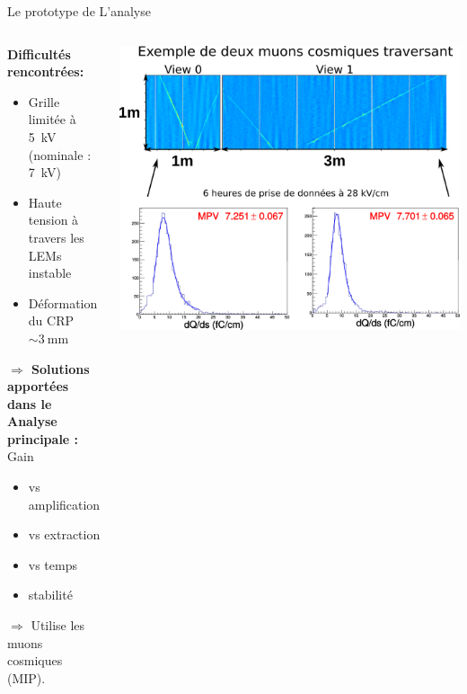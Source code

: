     \begin{frame}{Le prototype de \TOO{}}{L'analyse}
       	\begin{scriptsize}
       		\vfill
       		\begin{columns}
       			\begin{column}{0.32\textwidth}
       				\textbf{Difficultés rencontrées:} 
       				\begin{itemize}
       					\item Grille limitée à \SI{5}{\kilo\volt} (nominale : \SI{7}{\kilo\volt})
       					\item Haute tension à travers les LEMs instable
       					\item Déformation du CRP $\sim\SI{3}{\milli\meter}$
       				\end{itemize}
       				\textbf{$\Rightarrow$ Solutions apportées dans le \SSS{}} \\
       				\vspace{0.3cm}
       				\textbf{Analyse principale :} Gain
       				\begin{itemize}
           				\item vs amplification
           				\item vs extraction
           				\item vs temps
           				\item stabilité
       				\end{itemize}
       				$\Rightarrow$ Utilise les muons cosmiques (MIP).
       			\end{column}\hfill
       			\begin{column}{0.72\textwidth}
       				\includegraphics[width=\textwidth]{./pictures/run840.png}\\
       			\end{column}
       		\end{columns}
	    \end{scriptsize}
    \end{frame}

